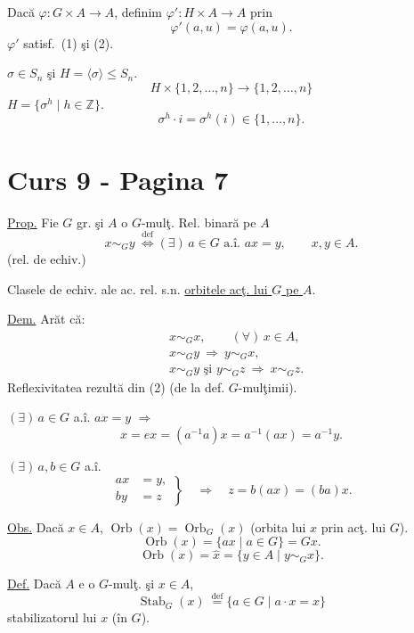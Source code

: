 \noindent Dacă $\varphi:G\times A\longrightarrow A$, definim
$\varphi':H\times A\longrightarrow A$ prin
\[
\varphi'(a,u)=\varphi(a,u).
\]
\noindent $\varphi'$ satisf.\ (1) şi (2).

\bigskip
\noindent $\sigma\in S_n$ şi $H=\langle\sigma\rangle\leq S_n$.
\[
H\times\{1,2,\ldots,n\}\longrightarrow\{1,2,\ldots,n\}
\]
\noindent $H=\{\sigma^h\mid h\in\mathbb{Z}\}$.
\[
\sigma^h\cdot i=\sigma^h(i)\in\{1,\ldots,n\}.
\]




\bigskip

\section*{Curs 9 - Pagina 7}


\noindent\underline{Prop.} Fie $G$ gr. şi $A$ o $G$-mulţ. Rel. binară pe $A$
\[
x\sim_G y\ \overset{\mathrm{def}}{\Longleftrightarrow}
(\exists)\,a\in G\text{ a.î. }a x=y,\qquad x,y\in A.
\]
\noindent (rel. de echiv.)

\bigskip
\noindent Clasele de echiv. ale ac. rel. s.n. \underline{orbitele acţ. lui $G$ pe $A$}.

\bigskip
\noindent\underline{Dem.} Arăt că:
\begin{align*}
&x\sim_G x,\qquad (\forall)\,x\in A,\\
&x\sim_G y\ \Longrightarrow\ y\sim_G x,\\
&x\sim_G y\text{ şi }y\sim_G z\ \Longrightarrow\ x\sim_G z.
\end{align*}
\noindent Reflexivitatea rezultă din (2) (de la def. $G$-mulţimii).

\bigskip
\noindent $(\exists)\,a\in G$ a.î. $a x=y$ $\Longrightarrow$
\[
x=e x=(a^{-1}a)x=a^{-1}(a x)=a^{-1}y.
\]

\bigskip
\noindent $(\exists)\,a,b\in G$ a.î.
\[
\left.\begin{aligned}
 a x&=y,\\
 b y&=z
\end{aligned}\right\}
\quad\Longrightarrow\quad z=b(a x)=(ba)x.
\]

\bigskip
\noindent\underline{Obs.} Dacă $x\in A$, $\operatorname{Orb}(x)=\operatorname{Orb}_G(x)$
(orbita lui $x$ prin acţ. lui $G$).
\[
\operatorname{Orb}(x)=\{a x\mid a\in G\}=Gx.
\]
\[
\operatorname{Orb}(x)=\widehat{x}
=\{y\in A\mid y\sim_G x\}.
\]

\bigskip
\noindent\underline{Def.} Dacă $A$ e o $G$-mulţ. şi $x\in A$,
\[
\operatorname{Stab}_G(x)\ \overset{\mathrm{def}}{=}
\{a\in G\mid a\cdot x=x\}
\]
\noindent stabilizatorul lui $x$ (în $G$).

